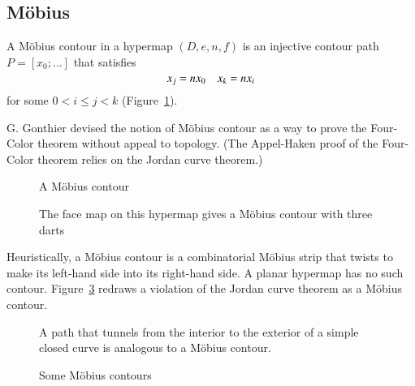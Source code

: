 \subsection{M\"obius}

\begin{definition} A M\"obius contour in a hypermap
$(D,e,n,f)$ is an
injective contour path $P=[x_0;\ldots]$ that satisfies
\begin{equation}
\tlabel{eqn:mobius}
x_j = n x_0\quad x_k = n x_i
\end{equation}
for some $0 < i\le j< k$ (Figure~\ref{fig:mobius}).
%
\end{definition}


\begin{remark}
G. Gonthier devised the notion of M\"obius contour as a way to prove
the Four-Color theorem without appeal to topology.  (The Appel-Haken
proof of the Four-Color theorem relies on the Jordan curve theorem.)
\end{remark}

\begin{figure}[htb]
\centering
{}
\caption{A M\"obius contour}
\label{fig:mobius}
\end{figure}

\begin{figure}[htb]
\centering
{}
\caption{The face map on this hypermap gives a M\"obius contour with
three darts}
\label{fig:3m}
\end{figure}

\begin{remark} Heuristically, a M\"obius contour is a 
combinatorial M\"obius strip that
twists to make 
its left-hand side into
its right-hand side.  A planar hypermap has no such contour.  
Figure~\ref{fig:violate-jct}
redraws a violation of the Jordan curve theorem
as a M\"obius contour.   
\end{remark}

\begin{figure}[htb]
\centering
{}
\caption{A path that tunnels from the interior to the exterior
of a simple closed curve
is analogous to a M\"obius contour.}
\label{fig:violate-jct}
\end{figure}

\begin{figure}[htb]
\centering
{}
\caption{Some M\"obius contours}
\label{fig:mobius-contour}
\end{figure}






